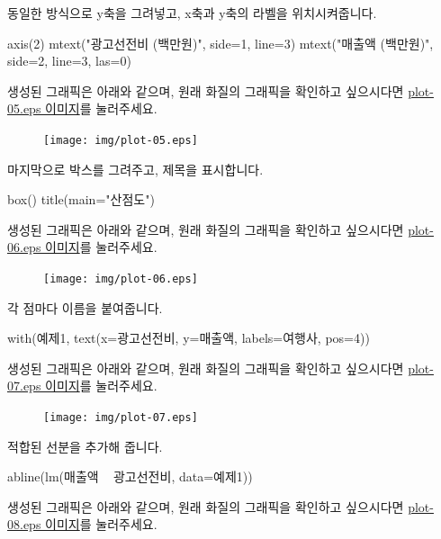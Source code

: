 동일한 방식으로 y축을 그려넣고, x축과 y축의 라벨을 위치시켜줍니다. 
\begin{Schunk}
\begin{Soutput}	
axis(2)
mtext("광고선전비 (백만원)", side=1, line=3)
mtext("매출액 (백만원)", side=2, line=3, las=0)
\end{Soutput}
\end{Schunk}
생성된 그래픽은 아래와 같으며, 원래 화질의 그래픽을 확인하고 싶으시다면 \href{http://korea.gnu.org/gnustats/img/plot-05.eps}{plot-05.eps 이미지}를 눌러주세요. 

\begin{figure}
\begin{center}
\texttt{[image: img/plot-05.eps]}
\end{center}
\end{figure}


마지막으로 박스를 그려주고, 제목을 표시합니다. 
\begin{Schunk}
\begin{Soutput}	
box()
title(main="산점도")
\end{Soutput}
\end{Schunk}
생성된 그래픽은 아래와 같으며, 원래 화질의 그래픽을 확인하고 싶으시다면 \href{http://korea.gnu.org/gnustats/img/plot-06.eps}{plot-06.eps 이미지}를 눌러주세요. 

\begin{figure}
\begin{center}
\texttt{[image: img/plot-06.eps]}
\end{center}
\end{figure}

각 점마다 이름을 붙여줍니다.
\begin{Schunk}
\begin{Soutput}	
with(예제1, text(x=광고선전비, y=매출액, labels=여행사, pos=4))
\end{Soutput}
\end{Schunk}
생성된 그래픽은 아래와 같으며, 원래 화질의 그래픽을 확인하고 싶으시다면 \href{http://korea.gnu.org/gnustats/img/plot-07.eps}{plot-07.eps 이미지}를 눌러주세요. 

\begin{figure}
\begin{center}
\texttt{[image: img/plot-07.eps]}
\end{center}
\end{figure}

적합된 선분을 추가해 줍니다. 
\begin{Schunk}
\begin{Soutput}	
abline(lm(매출액 ~ 광고선전비, data=예제1))
\end{Soutput}
\end{Schunk}
생성된 그래픽은 아래와 같으며, 원래 화질의 그래픽을 확인하고 싶으시다면 \href{http://korea.gnu.org/gnustats/img/plot-08.eps}{plot-08.eps 이미지}를 눌러주세요. 

